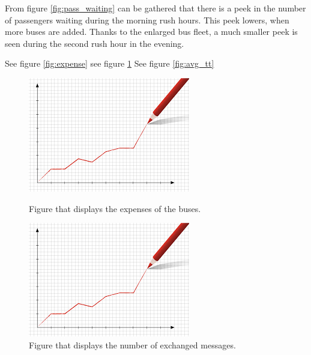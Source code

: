 \documentclass[a4paper]{article}
\begin{document}
From figure \ref{fig:pass_waiting} can be gathered that there is a peek in the number of passengers waiting during the morning rush hours. This peek lowers, when more buses are added. Thanks to the enlarged bus fleet, a much smaller peek is seen during the second rush hour in the evening.

See figure \ref{fig:expense}
see figure \ref{fig:messages}
See figure \ref{fig:avg_tt}

\begin{figure}
\centering
\begin{minipage}{.5\textwidth}
  \includegraphics[width=.4\textwidth]{expenses.jpg}
  \caption{\label{fig:expense}Figure that displays the expenses of the buses.}
\end{minipage}%
\begin{minipage}{.5\textwidth}
  \includegraphics[width=.4\textwidth]{nr_messages.jpg}
  \caption{\label{fig:messages}Figure that displays the number of exchanged messages.}
\end{minipage}
\end{figure}
\end{document}
